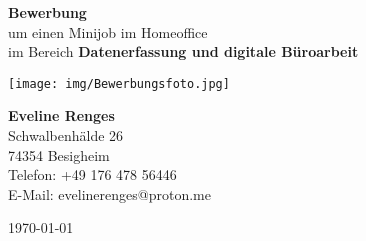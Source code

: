 \documentclass[a4paper,12pt]{article}
\begin{document}
\thispagestyle{empty} %

\vspace*{1cm}

\begin{center}
  {\Huge \textbf{Bewerbung}}\\[0.3cm]
  {\large um einen Minijob im Homeoffice}\\[0.2cm]
  {\large im Bereich \textbf{Datenerfassung und digitale Büroarbeit}}
\end{center}

\vspace{1.8cm}

\begin{center}
  \texttt{[image: img/Bewerbungsfoto.jpg]} %
\end{center}

\vfill

\begin{center}
  \textbf{Eveline Renges} \\
  Schwalbenhälde 26\\
  74354 Besigheim \\
  Telefon: +49 176 478 56446\\
  E-Mail: evelinerenges@proton.me \\
\end{center}

\vspace{1cm}

\begin{center}
  \today
\end{center}
\end{document}
